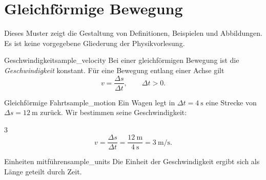 \section{Gleichförmige Bewegung}\label{sec:sample_motion}
Dieses Muster zeigt die Gestaltung von Definitionen, Beispielen und Abbildungen. Es ist keine vorgegebene Gliederung der Physikvorlesung.
\begin{DefinitionBox}{Geschwindigkeit}{sample_velocity}
Bei einer gleichförmigen Bewegung ist die \emph{Geschwindigkeit}  konstant. Für eine Bewegung entlang einer Achse gilt
\[
 v=\frac{\Delta s}{\Delta t},\qquad \Delta t>0.
\]
\end{DefinitionBox}
\begin{ExampleBox}{Gleichförmige Fahrt}{sample_motion}
Ein Wagen legt in \(\Delta t=\qty{4}{\second}\) eine Strecke von \(\Delta s=\qty{12}{\metre}\) zurück. Wir bestimmen seine Geschwindigkeit:
\begin{ClozeArea}[30]{3}
\[
 v=\frac{\Delta s}{\Delta t}=\frac{\qty{12}{\metre}}{\qty{4}{\second}}=\qty{3}{\metre\per\second}.
\]
\end{ClozeArea}
\begin{center}
\end{center}
\end{ExampleBox}
\begin{KeyPointBox}{Einheiten mitführen}{sample_units}
Die Einheit der Geschwindigkeit ergibt sich als Länge geteilt durch Zeit.
\end{KeyPointBox}
